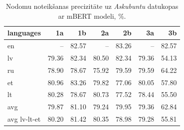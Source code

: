 \begin{table}[htbp]
  \centering
  \caption{Nodomu noteikšanas precizitāte uz \textit{Askubuntu} datukopas ar mBERT modeli, \%.}
    \begin{tabular}{lrrrrrr} \toprule
    languages & 1a & 1b & 2a & 2b & 3a & 3b \\\midrule
    en    &   --    & \cellcolor[rgb]{ .475,  .627,  .82}82.57 &  --     & \cellcolor[rgb]{ .357,  .545,  .78}83.26 &   --    & \cellcolor[rgb]{ .475,  .627,  .82}82.57 \\
    lv    & \cellcolor[rgb]{ .984,  .98,  .992}79.36 & \cellcolor[rgb]{ .514,  .655,  .835}82.34 & \cellcolor[rgb]{ .831,  .878,  .945}80.50 & \cellcolor[rgb]{ .514,  .655,  .835}82.34 & \cellcolor[rgb]{ .984,  .98,  .992}79.36 & \cellcolor[rgb]{ .973,  .412,  .42}54.13 \\
    ru    & \cellcolor[rgb]{ .984,  .973,  .98}78.90 & \cellcolor[rgb]{ .984,  .965,  .976}78.67 & \cellcolor[rgb]{ .984,  .902,  .914}75.92 & \cellcolor[rgb]{ .988,  .988,  1}79.59 & \cellcolor[rgb]{ .988,  .988,  1}79.59 & \cellcolor[rgb]{ .976,  .639,  .647}64.22 \\
    et    & \cellcolor[rgb]{ .753,  .824,  .918}80.96 & \cellcolor[rgb]{ .353,  .541,  .776}83.26 & \cellcolor[rgb]{ .949,  .961,  .988}79.82 & \cellcolor[rgb]{ .984,  .929,  .941}77.06 & \cellcolor[rgb]{ .91,  .933,  .973}80.05 & \cellcolor[rgb]{ .973,  .494,  .502}57.80 \\
    lt    & \cellcolor[rgb]{ .871,  .906,  .961}80.28 & \cellcolor[rgb]{ .984,  .965,  .976}78.67 & \cellcolor[rgb]{ .792,  .851,  .933}80.73 & \cellcolor[rgb]{ .984,  .941,  .949}77.52 & \cellcolor[rgb]{ .984,  .961,  .973}78.44 & \cellcolor[rgb]{ .973,  .439,  .451}55.50 \\\midrule
    avg   & \cellcolor[rgb]{ .941,  .957,  .984}79.87 & \cellcolor[rgb]{ .729,  .804,  .91}81.10 & \cellcolor[rgb]{ .984,  .98,  .992}79.24 & \cellcolor[rgb]{ .925,  .945,  .98}79.95 & \cellcolor[rgb]{ .984,  .98,  .992}79.36 & \cellcolor[rgb]{ .976,  .608,  .616}62.84 \\
    avg lv-lt-et & \cellcolor[rgb]{ .886,  .918,  .965}80.20 & \cellcolor[rgb]{ .675,  .769,  .89}81.42 & \cellcolor[rgb]{ .859,  .898,  .957}80.35 & \cellcolor[rgb]{ .984,  .973,  .984}78.98 & \cellcolor[rgb]{ .984,  .98,  .992}79.28 & \cellcolor[rgb]{ .973,  .447,  .455}55.81 \\\bottomrule
    \end{tabular}%
  \label{tab:askubuntu-bert}%
\end{table}%


